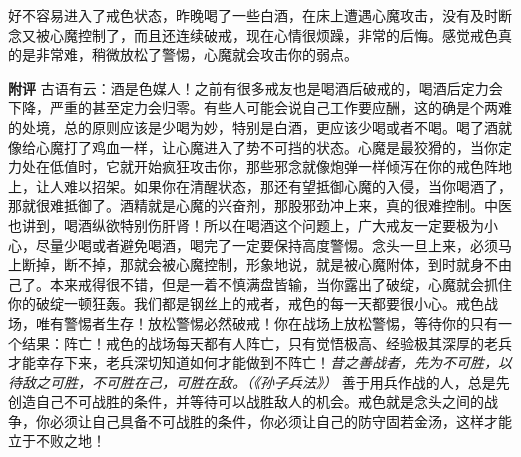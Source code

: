 \begin{case}
    好不容易进入了戒色状态，昨晚喝了一些白酒，在床上遭遇心魔攻击，没有及时断念又被心魔控制了，而且还连续破戒，现在心情很烦躁，非常的后悔。感觉戒色真的是非常难，稍微放松了警惕，心魔就会攻击你的弱点。

    \textbf{附评} 古语有云：酒是色媒人！之前有很多戒友也是喝酒后破戒的，喝酒后定力会下降，严重的甚至定力会归零。有些人可能会说自己工作要应酬，这的确是个两难的处境，总的原则应该是少喝为妙，特别是白酒，更应该少喝或者不喝。喝了酒就像给心魔打了鸡血一样，让心魔进入了势不可挡的状态。心魔是最狡猾的，当你定力处在低值时，它就开始疯狂攻击你，那些邪念就像炮弹一样倾泻在你的戒色阵地上，让人难以招架。如果你在清醒状态，那还有望抵御心魔的入侵，当你喝酒了，那就很难抵御了。酒精就是心魔的兴奋剂，那股邪劲冲上来，真的很难控制。中医也讲到，喝酒纵欲特别伤肝肾！所以在喝酒这个问题上，广大戒友一定要极为小心，尽量少喝或者避免喝酒，喝完了一定要保持高度警惕。念头一旦上来，必须马上断掉，断不掉，那就会被心魔控制，形象地说，就是被心魔附体，到时就身不由己了。本来戒得很不错，但是一着不慎满盘皆输，当你露出了破绽，心魔就会抓住你的破绽一顿狂轰。我们都是钢丝上的戒者，戒色的每一天都要很小心。戒色战场，唯有警惕者生存！放松警惕必然破戒！你在战场上放松警惕，等待你的只有一个结果：阵亡！戒色的战场每天都有人阵亡，只有觉悟极高、经验极其深厚的老兵才能幸存下来，老兵深切知道如何才能做到不阵亡！\textit{昔之善战者，先为不可胜，以待敌之可胜，不可胜在己，可胜在敌。（《孙子兵法》）} 善于用兵作战的人，总是先创造自己不可战胜的条件，并等待可以战胜敌人的机会。戒色就是念头之间的战争，你必须让自己具备不可战胜的条件，你必须让自己的防守固若金汤，这样才能立于不败之地！
\end{case}

